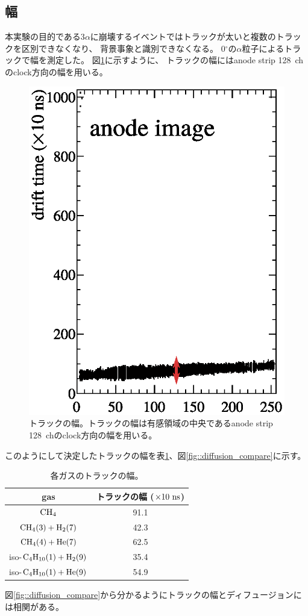 \documentclass[../master]{subfiles}
\begin{document}
\subsection{幅}
本実験の目的である3$\alpha$に崩壊するイベントではトラックが太いと複数のトラックを区別できなくなり、
背景事象と識別できなくなる。
0${}^{\circ}$の$\alpha$粒子によるトラックで幅を測定した。
図\ref{fig::track_width}に示すように、
トラックの幅にはanode strip 128~chのclock方向の幅を用いる。
\begin{figure}
  \centering
  \includegraphics[clip, width=0.5\columnwidth]{track_width.eps}
  \caption{トラックの幅。トラックの幅は有感領域の中央であるanode strip 128~chのclock方向の幅を用いる。}
  \label{fig::track_width}
\end{figure}
このようにして決定したトラックの幅を表\ref{tab::track_width}、図\ref{fig::diffusion_compare}に示す。
\begin{table}
  \centering
  \caption{各ガスのトラックの幅。}
  \label{tab::track_width}
  \begin{tabular}{cc}
    \toprule
    gas & トラックの幅 ($\times 10~{\rm ns}$)\\
    \midrule
    ${\rm CH_{4}}$                          & 91.1 \\
    ${\rm CH_{4} (3) + H_{2} (7)}$          & 42.3 \\
    ${\rm CH_{4} (4) + He (7)}$             & 62.5 \\
    iso-${\rm C_{4}H_{10} (1) + H_{2} (9)}$ & 35.4 \\
    iso-${\rm C_{4}H_{10} (1) + He (9)}$    & 54.9 \\
    \bottomrule
  \end{tabular}
\end{table}
図\ref{fig::diffusion_compare}から分かるようにトラックの幅とディフュージョンには相関がある。
\end{document}
